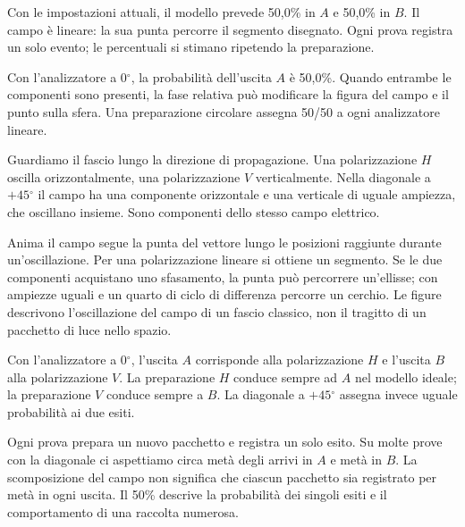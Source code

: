 Con le impostazioni attuali, il modello prevede 50,0\% in \(A\) e 50,0\% in \(B\). Il campo è lineare: la sua punta percorre il segmento disegnato. Ogni prova registra un solo evento; le percentuali si stimano ripetendo la preparazione.\par


Con l'analizzatore a \(0{}^{\circ} \), la probabilità dell'uscita \(A\) è 50,0\%. Quando entrambe le componenti sono presenti, la fase relativa può modificare la figura del campo e il punto sulla sfera. Una preparazione circolare assegna 50/50 a ogni analizzatore lineare.\par


Guardiamo il fascio lungo la direzione di propagazione. Una polarizzazione \(H\) oscilla orizzontalmente, una polarizzazione \(V\) verticalmente. Nella diagonale a \(+45{}^{\circ} \) il campo ha una componente orizzontale e una verticale di uguale ampiezza, che oscillano insieme. Sono componenti dello stesso campo elettrico.\par

\guillemotleft{}Anima il campo\guillemotright{} segue la punta del vettore lungo le posizioni raggiunte durante un'oscillazione. Per una polarizzazione lineare si ottiene un segmento. Se le due componenti acquistano uno sfasamento, la punta può percorrere un'ellisse; con ampiezze uguali e un quarto di ciclo di differenza percorre un cerchio. Le figure descrivono l'oscillazione del campo di un fascio classico, non il tragitto di un pacchetto di luce nello spazio.\par

Con l'analizzatore a \(0{}^{\circ} \), l'uscita \(A\) corrisponde alla polarizzazione \(H\) e l'uscita \(B\) alla polarizzazione \(V\). La preparazione \(H\) conduce sempre ad \(A\) nel modello ideale; la preparazione \(V\) conduce sempre a \(B\). La diagonale a \(+45{}^{\circ} \) assegna invece uguale probabilità ai due esiti.\par

Ogni prova prepara un nuovo pacchetto e registra un solo esito. Su molte prove con la diagonale ci aspettiamo circa metà degli arrivi in \(A\) e metà in \(B\). La scomposizione del campo non significa che ciascun pacchetto sia registrato per metà in ogni uscita. Il 50\% descrive la probabilità dei singoli esiti e il comportamento di una raccolta numerosa.\par

